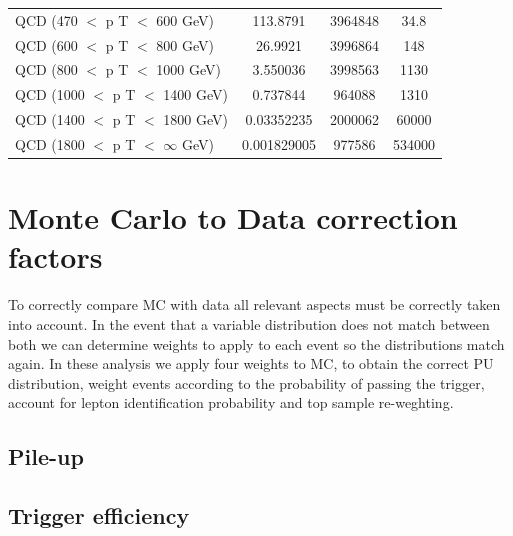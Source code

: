 \begin{longtable}{| l | c | c | c |}
  QCD (470 $<$ p T $<$ 600 GeV)                                 & 113.8791      &  3964848 &    34.8 \\
  QCD (600 $<$ p T $<$ 800 GeV)                                 & 26.9921       &  3996864 &     148 \\
  QCD (800 $<$ p T $<$ 1000 GeV)                                & 3.550036      &  3998563 &    1130 \\
  QCD (1000 $<$ p T $<$ 1400 GeV)                               & 0.737844      &   964088 &    1310 \\
  QCD (1400 $<$ p T $<$ 1800 GeV)                               & 0.03352235    &  2000062 &   60000 \\
  QCD (1800 $<$ p T $<$ $\infty$ GeV)                           & 0.001829005   &   977586 &  534000 \\
  \hline
\end{longtable}

\section{Monte Carlo to Data correction factors}


To correctly compare \gls{MC} with data all relevant aspects must be correctly taken into account. In the event that a variable distribution does not match between both we can determine weights to apply to each event so the distributions match again. In these analysis we apply four weights to \gls{MC}, to obtain the correct \gls{PU} distribution, weight events according to the probability of passing the trigger, account for lepton identification probability and top sample re-weghting.

\subsection{Pile-up}

\subsection{Trigger efficiency}
\label{SUBSECTION:ParkedDataAnalysis_CorrectionFactors_TriggerEfficiency}

